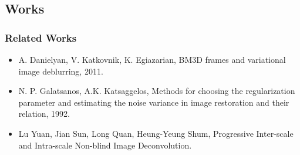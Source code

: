 \documentclass[hyperref={pdfpagelabels=false}]{beamer}
\begin{document}
\subsection{Works}
\begin{frame}
\frametitle{Related Works} 
\begin{itemize}
\item A. Danielyan, V. Katkovnik, K. Egiazarian, BM3D frames and variational image deblurring, 2011.
\item N. P. Galatsanos, A.K. Katsaggelos, Methods for choosing the regularization parameter and estimating the noise variance in image restoration and their relation, 1992.
\item Lu Yuan, Jian Sun, Long Quan, Heung-Yeung Shum, Progressive Inter-scale and Intra-scale Non-blind Image Deconvolution.
\end{itemize}
\end{frame}
\end{document}
